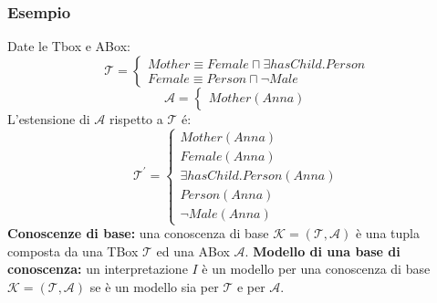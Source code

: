 \documentclass[../main.tex]{subfiles}
\newcommand{\spazio}{\vspace{2em} \newline}
\begin{document}
   \subsubsection{Esempio}
   Date le Tbox e ABox:
   \begin{equation*}
      \mathcal{T}=
      \begin{cases}
         Mother \equiv Female \sqcap \exists hasChild.Person\\
         Female \equiv Person \sqcap \lnot Male
      \end{cases}
   \end{equation*}
   \begin{equation*}
      \mathcal{A}=
      \begin{cases}
         Mother(Anna)
      \end{cases}
   \end{equation*}
   L'estensione di $\mathcal{A}$ rispetto a $\mathcal{T}$ é:
   \begin{equation*}
      \mathcal{T}^\prime=
      \begin{cases}
         Mother(Anna)\\
         Female(Anna)\\
         \exists hasChild.Person(Anna)\\
         Person(Anna)\\
         \lnot Male(Anna) 
      \end{cases}
   \end{equation*}
   \spazio
   \textbf{Conoscenze di base:} una conoscenza di base $\mathcal{K} = (\mathcal{T},\mathcal{A})$ è una tupla composta da una TBox $\mathcal{T}$ ed una ABox $\mathcal{A}$.
   \spazio
   \textbf{Modello di una base di conoscenza:} un interpretazione $I$ è un modello per una conoscenza di base $\mathcal{K} = (\mathcal{T},\mathcal{A})$ se è un modello sia per $\mathcal{T}$ e per $\mathcal{A}$.
\end{document}
